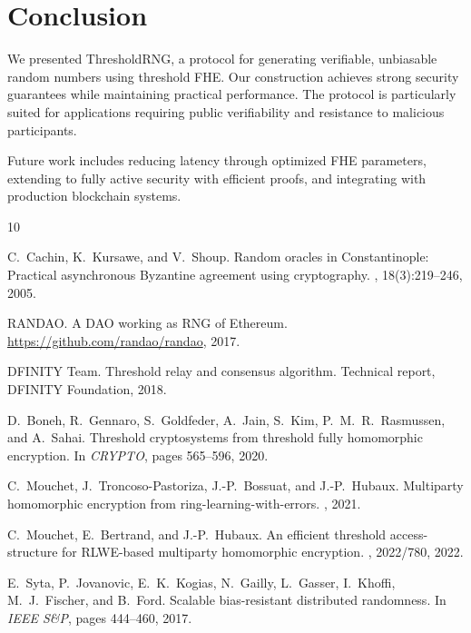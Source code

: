 \documentclass[11pt,a4paper]{article}
\begin{document}
\section{Conclusion}

We presented ThresholdRNG, a protocol for generating verifiable, unbiasable random numbers using threshold FHE. Our construction achieves strong security guarantees while maintaining practical performance. The protocol is particularly suited for applications requiring public verifiability and resistance to malicious participants.

Future work includes reducing latency through optimized FHE parameters, extending to fully active security with efficient proofs, and integrating with production blockchain systems.


\begin{thebibliography}{10}

C.~Cachin, K.~Kursawe, and V.~Shoup.
\newblock Random oracles in Constantinople: Practical asynchronous {B}yzantine agreement using cryptography.
, 18(3):219--246, 2005.

{RANDAO}.
\newblock A {DAO} working as {RNG} of {E}thereum.
\newblock \url{https://github.com/randao/randao}, 2017.

{DFINITY Team}.
\newblock Threshold relay and consensus algorithm.
\newblock Technical report, DFINITY Foundation, 2018.

D.~Boneh, R.~Gennaro, S.~Goldfeder, A.~Jain, S.~Kim, P.~M.~R.~Rasmussen, and A.~Sahai.
\newblock Threshold cryptosystems from threshold fully homomorphic encryption.
\newblock In {\em CRYPTO}, pages 565--596, 2020.

C.~Mouchet, J.~Troncoso-Pastoriza, J.-P.~Bossuat, and J.-P.~Hubaux.
\newblock Multiparty homomorphic encryption from ring-learning-with-errors.
, 2021.

C.~Mouchet, E.~Bertrand, and J.-P.~Hubaux.
\newblock An efficient threshold access-structure for {RLWE}-based multiparty homomorphic encryption.
, 2022/780, 2022.

E.~Syta, P.~Jovanovic, E.~K.~Kogias, N.~Gailly, L.~Gasser, I.~Khoffi, M.~J.~Fischer, and B.~Ford.
\newblock Scalable bias-resistant distributed randomness.
\newblock In {\em IEEE S\&P}, pages 444--460, 2017.


\end{thebibliography}
\end{document}
